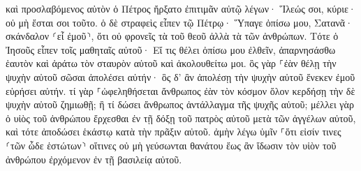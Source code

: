 \documentclass{openreader}
\begin{document}
καὶ προσλαβόμενος αὐτὸν ὁ Πέτρος ἤρξατο ἐπιτιμᾶν αὐτῷ λέγων· Ἵλεώς σοι, κύριε· οὐ μὴ ἔσται σοι τοῦτο. 
ὁ δὲ στραφεὶς εἶπεν τῷ Πέτρῳ· Ὕπαγε ὀπίσω μου, Σατανᾶ· σκάνδαλον ⸂εἶ ἐμοῦ⸃, ὅτι οὐ φρονεῖς τὰ τοῦ θεοῦ ἀλλὰ τὰ τῶν ἀνθρώπων. 
Τότε ὁ Ἰησοῦς εἶπεν τοῖς μαθηταῖς αὐτοῦ· Εἴ τις θέλει ὀπίσω μου ἐλθεῖν, ἀπαρνησάσθω ἑαυτὸν καὶ ἀράτω τὸν σταυρὸν αὐτοῦ καὶ ἀκολουθείτω μοι. 
ὃς γὰρ ⸀ἐὰν θέλῃ τὴν ψυχὴν αὐτοῦ σῶσαι ἀπολέσει αὐτήν· ὃς δ’ ἂν ἀπολέσῃ τὴν ψυχὴν αὐτοῦ ἕνεκεν ἐμοῦ εὑρήσει αὐτήν. 
τί γὰρ ⸀ὠφεληθήσεται ἄνθρωπος ἐὰν τὸν κόσμον ὅλον κερδήσῃ τὴν δὲ ψυχὴν αὐτοῦ ζημιωθῇ; ἢ τί δώσει ἄνθρωπος ἀντάλλαγμα τῆς ψυχῆς αὐτοῦ; 
μέλλει γὰρ ὁ υἱὸς τοῦ ἀνθρώπου ἔρχεσθαι ἐν τῇ δόξῃ τοῦ πατρὸς αὐτοῦ μετὰ τῶν ἀγγέλων αὐτοῦ, καὶ τότε ἀποδώσει ἑκάστῳ κατὰ τὴν πρᾶξιν αὐτοῦ. 
ἀμὴν λέγω ὑμῖν ⸀ὅτι εἰσίν τινες ⸂τῶν ὧδε ἑστώτων⸃ οἵτινες οὐ μὴ γεύσωνται θανάτου ἕως ἂν ἴδωσιν τὸν υἱὸν τοῦ ἀνθρώπου ἐρχόμενον ἐν τῇ βασιλείᾳ αὐτοῦ. 
\end{document}
